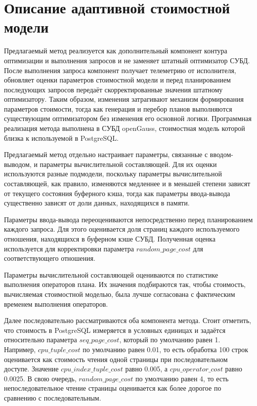 \section{Описание адаптивной стоимостной модели}\label{sec:ch2/sec2}

Предлагаемый метод реализуется как дополнительный компонент контура
оптимизации и выполнения запросов и не заменяет штатный оптимизатор СУБД.
После выполнения запроса компонент получает телеметрию от исполнителя,
обновляет оценки параметров стоимостной модели и перед планированием
последующих запросов передаёт скорректированные значения штатному
оптимизатору. Таким образом, изменения затрагивают механизм формирования
параметров стоимости, тогда как генерация и перебор планов выполняются
существующим оптимизатором без изменения его основной логики. Программная
реализация метода выполнена в СУБД openGauss, стоимостная модель которой
близка к используемой в PostgreSQL.

Предлагаемый метод отдельно настраивает параметры, связанные с
вводом-выводом, и параметры вычислительной составляющей. Для их оценки
используются разные подмодели, поскольку параметры вычислительной
составляющей, как правило, изменяются медленнее и в меньшей степени зависят
от текущего состояния буферного кэша, тогда как параметры ввода-вывода
существенно зависят от доли данных, находящихся в памяти.

Параметры ввода-вывода переоцениваются непосредственно перед планированием
каждого запроса. Для этого оценивается доля страниц каждого используемого
отношения, находящихся в буферном кэше СУБД. Полученная оценка используется
для корректировки параметра \(random\_page\_cost\) для соответствующего
отношения.

Параметры вычислительной составляющей оцениваются по статистике выполнения
операторов плана. Их значения подбираются так, чтобы стоимость, вычисляемая
стоимостной моделью, была лучше согласована с фактическим временем выполнения
операторов.

Далее последовательно рассматриваются оба компонента метода. Стоит отметить,
что стоимость в PostgreSQL измеряется в условных единицах и задаётся
относительно параметра \(seq\_page\_cost\), который по умолчанию равен 1.
Например, \(cpu\_tuple\_cost\) по умолчанию равен 0.01, то есть обработка
100 строк оценивается как стоимость чтения одной страницы при
последовательном доступе. Значение \(cpu\_index\_tuple\_cost\) равно 0.005,
а \(cpu\_operator\_cost\) равно 0.0025. В свою очередь,
\(random\_page\_cost\) по умолчанию равен 4, то есть непоследовательное
чтение страницы оценивается как более дорогое по сравнению с
последовательным.

